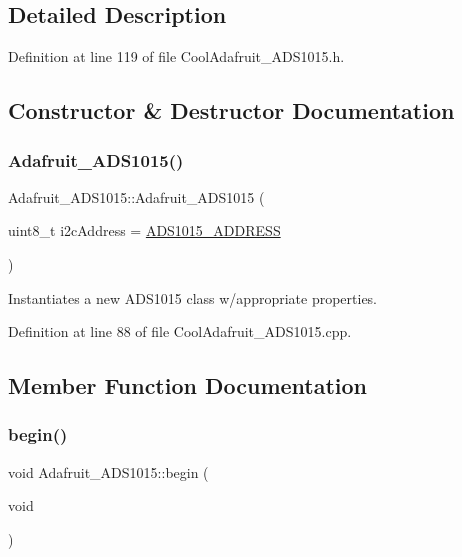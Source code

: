 \subsection{Detailed Description}


Definition at line 119 of file Cool\+Adafruit\+\_\+\+A\+D\+S1015.\+h.



\subsection{Constructor \& Destructor Documentation}
\mbox{\label{class_adafruit___a_d_s1015_a12dfb7b48af1a8e411c59f775c6457ab}} 
\subsubsection{\texorpdfstring{Adafruit\+\_\+\+A\+D\+S1015()}{Adafruit\_ADS1015()}}
{\footnotesize\ttfamily Adafruit\+\_\+\+A\+D\+S1015\+::\+Adafruit\+\_\+\+A\+D\+S1015 (\begin{DoxyParamCaption}\item[{uint8\+\_\+t}]{i2c\+Address = {\ttfamily \hyperlink{_cool_adafruit___a_d_s1015_8h_ae55d158023984e8f0ddc80b58d5b30dc}{A\+D\+S1015\+\_\+\+A\+D\+D\+R\+E\+SS}} }\end{DoxyParamCaption})}



Instantiates a new A\+D\+S1015 class w/appropriate properties. 



Definition at line 88 of file Cool\+Adafruit\+\_\+\+A\+D\+S1015.\+cpp.



\subsection{Member Function Documentation}
\mbox{\label{class_adafruit___a_d_s1015_a6eba7c3cd854927f60883bb371e5faa6}} 
\subsubsection{\texorpdfstring{begin()}{begin()}}
{\footnotesize\ttfamily void Adafruit\+\_\+\+A\+D\+S1015\+::begin (\begin{DoxyParamCaption}\item[{void}]{ }\end{DoxyParamCaption})}




